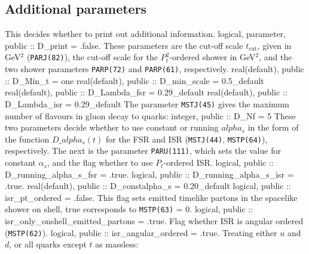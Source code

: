 \subsection{Additional parameters}
This decides whether to print out additional information.
\nwenddocs{}\plusendmoddef
  logical, parameter, public :: D_print = .false.
\eatline
\nwendcode{}\nwdocspar
These parameters are the cut-off scale $t_{\text{cut}}$, given in
GeV$^2$ ({\tt{}PARJ(82)}), the cut-off scale for the $P_t^2$-ordered
shower in GeV$^2$, and the two shower parameters {\tt{}PARP(72)} and
{\tt{}PARP(61)}, respectively.
\nwenddocs{}\plusendmoddef
  real(default), public :: D_Min_t = one
  real(default), public :: D_min_scale = 0.5_default
  real(default), public :: D_Lambda_fsr = 0.29_default
  real(default), public :: D_Lambda_isr = 0.29_default
\eatline
\eatline
\nwendcode{}\nwdocspar
The parameter {\tt{}MSTJ(45)} gives the maximum number of flavours in
gluon decay to quarks:
\nwenddocs{}\plusendmoddef
  integer, public :: D_Nf = 5
\nwendcode{} %
\nwenddocs{}\nwdocspar
These two parameters decide whether to use constant or running
$alpha_s$ in the form of the function $D\_{alpha_s} (t)$ for the FSR
and ISR ({\tt{}MSTJ(44)}, {\tt{}MSTP(64)}), respectively. The next is the
parameter {\tt{}PARU(111)}, which sets the value for constant $\alpha_s$,
and the flag whether to use $P_t$-ordered ISR.
\nwenddocs{}\plusendmoddef
  logical, public :: D_running_alpha_s_fsr = .true.
  logical, public :: D_running_alpha_s_isr = .true.
  real(default), public :: D_constalpha_s = 0.20_default
  logical, public :: isr_pt_ordered = .false.
\eatline
\eatline
\eatline
\eatline
\nwendcode{}\nwdocspar
This flag sets emitted timelike partons in the spacelike shower on
shell, true corresponds to {\tt{}MSTP(63)} = 0.
\nwenddocs{}\plusendmoddef
  logical, public :: isr_only_onshell_emitted_partons = .true.
\eatline
\nwendcode{}\nwdocspar
Flag whether ISR is angular ordered ({\tt{}MSTP(62)}).
\nwenddocs{}\plusendmoddef
  logical, public :: isr_angular_ordered = .true.
\eatline
\nwendcode{}\nwdocspar
Treating either $u$ and $d$, or all quarks except $t$ as massless:
\nwenddocs{}\plusendmoddef

